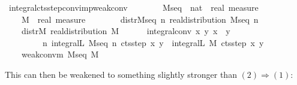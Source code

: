 \documentclass{article}
\theoremstyle{definition}
\begin{document}
\begin{isabellebody}
\isamarkupfalse%
\ integral{\isacharunderscore}cts{\isacharunderscore}step{\isacharunderscore}conv{\isacharunderscore}imp{\isacharunderscore}weak{\isacharunderscore}conv{\isacharcolon}\isanewline
\ \ \ \isanewline
\ \ \ \ M{\isacharunderscore}seq\ {\isacharcolon}{\isacharcolon}\ {\isachardoublequoteopen}nat\ {\isasymRightarrow}\ real\ measure{\isachardoublequoteclose}\ \isanewline
\ \ \ \ M\ {\isacharcolon}{\isacharcolon}\ {\isachardoublequoteopen}real\ measure{\isachardoublequoteclose}\isanewline
\ \ \ \isanewline
\ \ \ \ distr{\isacharunderscore}M{\isacharunderscore}seq{\isacharcolon}\ {\isachardoublequoteopen}{\isasymAnd}n{\isachardot}\ real{\isacharunderscore}distribution\ {\isacharparenleft}M{\isacharunderscore}seq\ n{\isacharparenright}{\isachardoublequoteclose}\ \ \isanewline
\ \ \ \ distr{\isacharunderscore}M{\isacharcolon}\ {\isachardoublequoteopen}real{\isacharunderscore}distribution\ M{\isachardoublequoteclose}\ \ \isanewline
\ \ \ \ integral{\isacharunderscore}conv{\isacharcolon}\ {\isachardoublequoteopen}{\isasymAnd}x\ y{\isachardot}\ x\ {\isacharless}\ y\ {\isasymLongrightarrow}\isanewline
\ \ \ \ \ \ \ \ \ {\isacharparenleft}{\isasymlambda}n{\isachardot}\ integral\isactrlsup L\ {\isacharparenleft}M{\isacharunderscore}seq\ n{\isacharparenright}\ {\isacharparenleft}cts{\isacharunderscore}step\ x\ y{\isacharparenright}{\isacharparenright}\ {\isacharminus}{\isacharminus}{\isacharminus}{\isacharminus}{\isachargreater}\ integral\isactrlsup L\ M\ {\isacharparenleft}cts{\isacharunderscore}step\ x\ y{\isacharparenright}{\isachardoublequoteclose}\isanewline
\ \ \ \isanewline
\ \ \ \ {\isachardoublequoteopen}weak{\isacharunderscore}conv{\isacharunderscore}m\ M{\isacharunderscore}seq\ M{\isachardoublequoteclose}\isanewline
\end{isabellebody}

\medskip

This can then be weakened to something slightly stronger than $(2) \Longrightarrow (1)$:

\medskip
\end{document}
